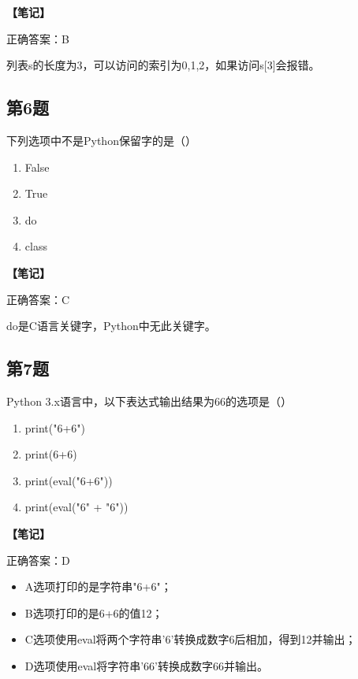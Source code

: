 \begin{mdframed}[linewidth=1pt, linecolor=black]

  \textbf{\color{red}【笔记】}

  正确答案：B

  列表s的长度为3，可以访问的索引为0,1,2，如果访问s[3]会报错。

\end{mdframed}

\subsection{第6题}
下列选项中不是Python保留字的是（）

\begin{enumerate}[label=\Alph*.]
  \item False
  \item True
  \item do
  \item class
\end{enumerate}

\begin{mdframed}[linewidth=1pt, linecolor=black]

  \textbf{\color{red}【笔记】}

  正确答案：C

  do是C语言关键字，Python中无此关键字。

\end{mdframed}

\subsection{第7题}
Python 3.x语言中，以下表达式输出结果为66的选项是（）

\begin{enumerate}[label=\Alph*.]
  \item print("6+6")
  \item print(6+6)
  \item print(eval("6+6"))
  \item print(eval("6" + "6"))
\end{enumerate}

\begin{mdframed}[linewidth=1pt, linecolor=black]

  \textbf{\color{red}【笔记】}

  正确答案：D

  \begin{itemize}
    \item A选项打印的是字符串"6+6"；
    \item B选项打印的是6+6的值12；
    \item C选项使用eval将两个字符串'6'转换成数字6后相加，得到12并输出；
    \item D选项使用eval将字符串'66'转换成数字66并输出。
  \end{itemize}

\end{mdframed}

